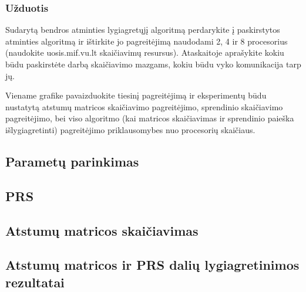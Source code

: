 \documentclass[a4paper,10pt]{article}
\begin{document}
\subsubsection{Užduotis}
Sudarytą bendros atminties lygiagretųjį algoritmą perdarykite į paskirstytos atminties algoritmą ir ištirkite jo pagreitėjimą naudodami 2, 4 ir 8 procesorius (naudokite uosis.mif.vu.lt skaičiavimų resursus). Ataskaitoje aprašykite kokiu būdu paskirstėte darbą skaičiavimo mazgams, kokiu būdu vyko komunikacija tarp jų.

Viename grafike pavaizduokite tiesinį pagreitėjimą ir eksperimentų būdu nustatytą atstumų matricos skaičiavimo pagreitėjimo, sprendinio skaičiavimo pagreitėjimo, bei viso algoritmo (kai matricos skaičiavimas ir sprendinio paieška išlygiagretinti) pagreitėjimo priklausomybes nuo procesorių skaičiaus.
\newpage
\subsection{Parametų parinkimas}
\subsection{PRS}
\subsection{Atstumų matricos skaičiavimas}
\subsection{Atstumų matricos ir PRS dalių lygiagretinimos rezultatai}
\end{document}
